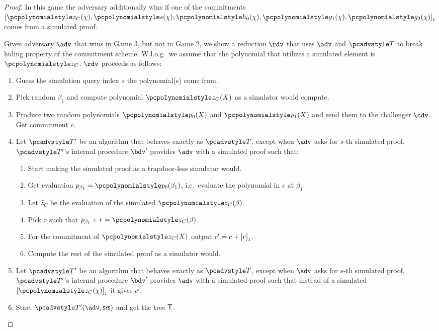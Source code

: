 \documentclass[runningheads,11pt]{llncs}
\begin{document}
\begin{proof}
   In this game the adversary additionally wins if one of the
  commitments
  $\gone{\p{z}_C (\chi), \p{s} (\chi), \p{h_0} (\chi), \p{g_1} (\chi), \p{g_2}
    (\chi)}$ comes from a simulated proof.

   Given adversary $\adv$ that wins in Game 3, but not
  in Game 2, we show a reduction $\rdv$ that uses $\adv$ and $\tdv$ to break
  hiding property of the commitment scheme.  W.l.o.g.~we assume that the
  polynomial that utilizes a simulated element is $\p{z}_C$. $\rdv$ proceeds as
  follows:
  \begin{enumerate}
  \item Guess the simulation query index $s$ the polynomial(s) come from.
  \item Pick random $\beta_1$ and compute polynomial $\p{z}_C (X)$ as a
    simulator would compute.
  \item Produce two random polynomials $\p{p_0} (X)$ and $\p{p_1} (X)$ and send
    them to the challenger $\cdv$. Get commitment $c$.
  \item Let $\tdv'$ be an algorithm that behaves exactly as $\tdv$, except when
    $\adv$ asks for $s$-th simulated proof, $\tdv'$'s internal procedure $\bdv'$
    provides $\adv$ with a simulated proof such that:
    \begin{enumerate}
    \item Start making the simulated proof as a trapdoor-less simulator would.
    \item Get evaluation $p_{\beta_1} = \p{p_b} (\beta_1)$, i.e.~evaluate the polynomial
      in $c$ at $\beta_1$.
    \item Let $\tilde{z_C}$ be the evaluation of the simulated $\p{z}_C (\beta)$.
    \item Pick $r$ such that $p_{\beta_1} + r = \p{z}_C (\beta)$.
    \item For the commitment of $\p{z}_C (X)$ output $c' = c + \left[r\right]_{1}$.
    \item Compute the rest of the simulated proof as a simulator would.
    \end{enumerate}
  \item Let $\tdv'$ be an algorithm that behaves exactly as $\tdv$, except when
    $\adv$ asks for $s$-th simulated proof, $\tdv'$'s internal procedure $\bdv'$
    provides $\adv$ with a simulated proof such that instead of a simulated
    $\gone{\p{z}_C (\chi)}$ it gives $c'$.
  \item Start $\tdv'(\adv, \srs)$ and get the tree $\mathsf{T}$.

\end{enumerate}
\end{proof}
\end{document}
